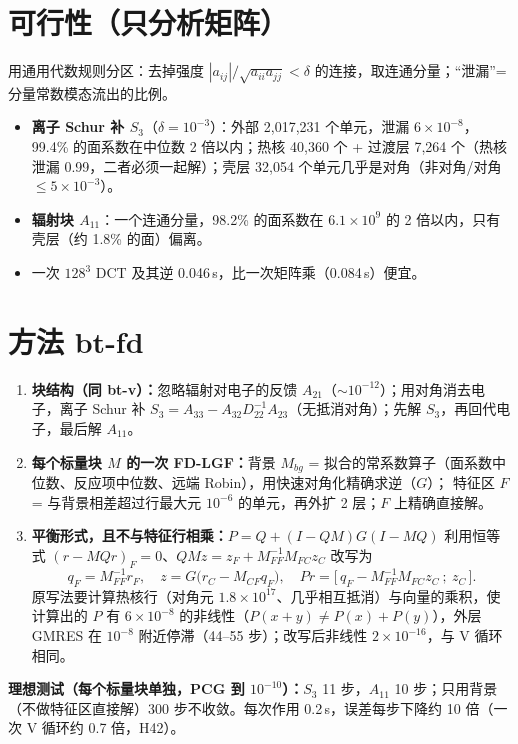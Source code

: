 \documentclass[11pt,a4paper]{ctexart}
\begin{document}
\section{可行性（只分析矩阵）}
用通用代数规则分区：去掉强度 $|a_{ij}|/\sqrt{a_{ii}a_{jj}}<\delta$ 的连接，取连通分量；“泄漏”= 分量常数模态流出的比例。
\begin{itemize}
\item \textbf{离子 Schur 补 $S_3$}（$\delta=10^{-3}$）：外部 2,017,231 个单元，泄漏 $6\times10^{-8}$，99.4\% 的面系数在中位数 2 倍以内；热核 40,360 个 + 过渡层 7,264 个（热核泄漏 0.99，二者必须一起解）；壳层 32,054 个单元几乎是对角（非对角/对角 $\le5\times10^{-3}$）。
\item \textbf{辐射块 $A_{11}$}：一个连通分量，98.2\% 的面系数在 $6.1\times10^9$ 的 2 倍以内，只有壳层（约 1.8\% 的面）偏离。
\item 一次 $128^3$ DCT 及其逆 0.046\,s，比一次矩阵乘（0.084\,s）便宜。
\end{itemize}

\section{方法 bt-fd}
\begin{enumerate}
\item \textbf{块结构（同 bt-v）：}忽略辐射对电子的反馈 $A_{21}$（$\sim10^{-12}$）；用对角消去电子，离子 Schur 补 $S_3=A_{33}-A_{32}D_{22}^{-1}A_{23}$（无抵消对角）；先解 $S_3$，再回代电子，最后解 $A_{11}$。
\item \textbf{每个标量块 $M$ 的一次 FD-LGF：}背景 $M_{bg}$ = 拟合的常系数算子（面系数中位数、反应项中位数、远端 Robin），用快速对角化精确求逆（$G$）；
特征区 $F$ = 与背景相差超过行最大元 $10^{-6}$ 的单元，再外扩 2 层；$F$ 上精确直接解。
\item \textbf{平衡形式，且不与特征行相乘：}$P=Q+(I-QM)G(I-MQ)$ 利用恒等式 $(r-MQr)_F=0$、$QMz=z_F+M_{FF}^{-1}M_{FC}z_C$ 改写为
\[
q_F=M_{FF}^{-1}r_F,\quad z=G\big(r_C-M_{CF}q_F\big),\quad Pr=\big[\,q_F-M_{FF}^{-1}M_{FC}z_C\ ;\ z_C\,\big].
\]
原写法要计算热核行（对角元 $1.8\times10^{17}$、几乎相互抵消）与向量的乘积，使计算出的 $P$ 有 $6\times10^{-8}$ 的非线性（$P(x+y)\ne P(x)+P(y)$），外层 GMRES 在 $10^{-8}$ 附近停滞（44--55 步）；改写后非线性 $2\times10^{-16}$，与 V 循环相同。
\end{enumerate}
\textbf{理想测试（每个标量块单独，PCG 到 $10^{-10}$）：}$S_3$ 11 步，$A_{11}$ 10 步；只用背景（不做特征区直接解）300 步不收敛。每次作用 0.2\,s，误差每步下降约 10 倍（一次 V 循环约 0.7 倍，H42）。
\end{document}
